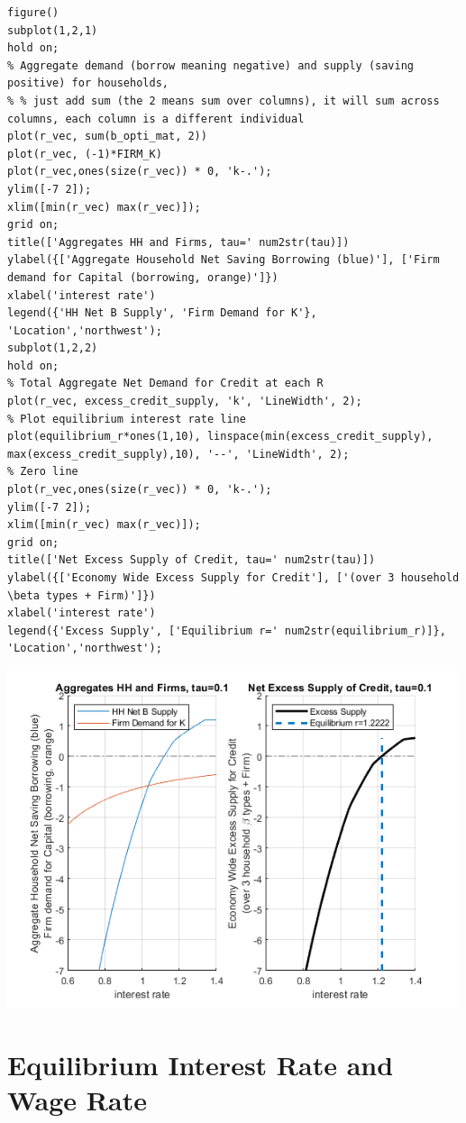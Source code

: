 \documentclass[
]{book}
\begin{document}
\begin{verbatim}
figure()
subplot(1,2,1)
hold on;
% Aggregate demand (borrow meaning negative) and supply (saving positive) for households, 
% % just add sum (the 2 means sum over columns), it will sum across columns, each column is a different individual
plot(r_vec, sum(b_opti_mat, 2))
plot(r_vec, (-1)*FIRM_K)
plot(r_vec,ones(size(r_vec)) * 0, 'k-.');
ylim([-7 2]);
xlim([min(r_vec) max(r_vec)]);
grid on;
title(['Aggregates HH and Firms, tau=' num2str(tau)])
ylabel({['Aggregate Household Net Saving Borrowing (blue)'], ['Firm demand for Capital (borrowing, orange)']})
xlabel('interest rate')
legend({'HH Net B Supply', 'Firm Demand for K'}, 'Location','northwest');
subplot(1,2,2)
hold on;
% Total Aggregate Net Demand for Credit at each R
plot(r_vec, excess_credit_supply, 'k', 'LineWidth', 2);
% Plot equilibrium interest rate line
plot(equilibrium_r*ones(1,10), linspace(min(excess_credit_supply), max(excess_credit_supply),10), '--', 'LineWidth', 2);
% Zero line
plot(r_vec,ones(size(r_vec)) * 0, 'k-.');
ylim([-7 2]);
xlim([min(r_vec) max(r_vec)]);
grid on;
title(['Net Excess Supply of Credit, tau=' num2str(tau)])
ylabel({['Economy Wide Excess Supply for Credit'], ['(over 3 household \beta types + Firm)']})
xlabel('interest rate')
legend({'Excess Supply', ['Equilibrium r=' num2str(equilibrium_r)]}, 'Location','northwest');
\end{verbatim}

\includegraphics[width=5.20833in,height=\textheight]{img/equilibrium_constrainedborrow_images/figure_4.png}

\hypertarget{equilibrium-interest-rate-and-wage-rate}{%
\section{Equilibrium Interest Rate and Wage Rate}\label{equilibrium-interest-rate-and-wage-rate}}
\end{document}
